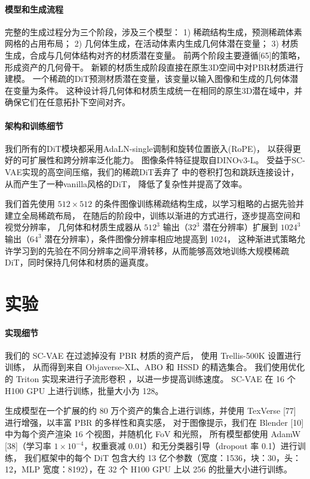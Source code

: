 \paragraph{模型和生成流程}
完整的生成过程分为三个阶段，涉及三个模型：
1) 稀疏结构生成，预测稀疏体素网格的占用布局；
2) 几何体生成，在活动体素内生成几何体潜在变量；
3) 材质生成，合成与几何体结构对齐的材质潜在变量。
前两个阶段主要遵循[65]的策略，形成资产的几何骨干。
新颖的材质生成阶段直接在原生3D空间中对PBR材质进行建模。
一个稀疏的DiT预测材质潜在变量，该变量以输入图像和生成的几何体潜在变量为条件。
这种设计将几何体和材质生成统一在相同的原生3D潜在域中，并确保它们在任意拓扑下空间对齐。


\paragraph{架构和训练细节}
我们所有的DiT模块都采用AdaLN-single调制和旋转位置嵌入(RoPE)，
以获得更好的可扩展性和跨分辨率泛化能力。
图像条件特征提取自DINOv3-L。
受益于SC-VAE实现的高空间压缩，我们的稀疏DiT丢弃了
中的卷积打包和跳跃连接设计，从而产生了一种vanilla风格的DiT，
降低了复杂性并提高了效率。

我们首先使用 $512 \times 512$ 的条件图像训练稀疏结构生成，以学习粗略的占据先验并建立全局稀疏布局，  
在随后的阶段中，训练以渐进的方式进行，逐步提高空间和视觉分辨率，  
几何体和材质生成器从 $512^3$ 输出（$32^3$ 潜在分辨率）扩展到 $1024^3$ 输出（$64^3$ 潜在分辨率），条件图像分辨率相应地提高到 1024，  
这种渐进式策略允许学习到的先验在不同分辨率之间平滑转移，从而能够高效地训练大规模稀疏 DiT，同时保持几何体和材质的逼真度。

\section{实验}

\paragraph{实现细节}
我们的 SC-VAE 在过滤掉没有 PBR 材质的资产后，
使用 Trellis-500K 设置进行训练，
从而得到来自 Objaverse-XL、ABO 和 HSSD 的精选集合。
我们使用优化的 Triton 实现来进行子流形卷积 ，以进一步提高训练速度。
SC-VAE 在 16 个 H100 GPU 上进行训练，批量大小为 128。

生成模型在一个扩展的约 80 万个资产的集合上进行训练，并使用 TexVerse [77] 进行增强，以丰富 PBR 的多样性和真实感，  
对于图像提示，我们在 Blender [10] 中为每个资产渲染 16 个视图，并随机化 FoV 和光照，  
所有模型都使用 AdamW [38]（学习率 $1 \times 10^{-4}$，权重衰减 $0.01$）和无分类器引导（dropout 率 0.1）进行训练，  
我们框架中的每个 DiT 包含大约 13 亿个参数（宽度：1536，块：30，头：12，MLP 宽度：8192），在 32 个 H100 GPU 上以 256 的批量大小进行训练。

